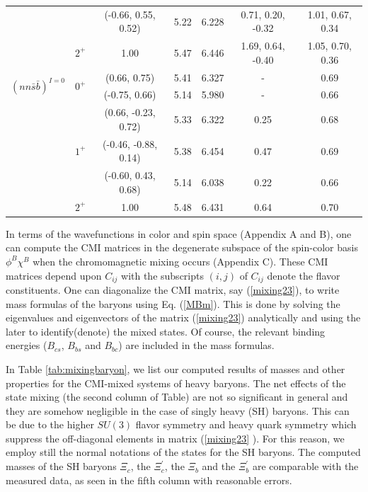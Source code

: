 \documentclass[12pt,prd,onecolumn,floatfix,nofootinbib]{revtex4}
\begin{document}
\begin{table}[!htb]
\begin{tabular}{ccccccc}
&  & (-0.66, 0.55, 0.52) & 5.22 & 6.228 & 0.71, 0.20, -0.32 & 1.01, 0.67,
0.34 \\
& $2^{+}$ & 1.00 & 5.47 & 6.446 & 1.69, 0.64, -0.40 & 1.05, 0.70, 0.36 \\
\multirow{2}{*}{${(nn\bar{s}\bar{b})}^{I=0}$} & \multirow{2}{*}{$0^{+}$} &
(0.66, 0.75) & 5.41 & 6.327 & - & 0.69 \\
&  & (-0.75, 0.66) & 5.14 & 5.980 & - & 0.66 \\
& \multirow{3}{*}{$1^{+}$} & (0.66, -0.23, 0.72) & 5.33 & 6.322 & 0.25 & 0.68
\\
&  & (-0.46, -0.88, 0.14) & 5.38 & 6.454 & 0.47 & 0.69 \\
&  & (-0.60, 0.43, 0.68) & 5.14 & 6.038 & 0.22 & 0.66 \\
& $2^{+}$ & 1.00 & 5.48 & 6.431 & 0.64 & 0.70 \\ \hline\hline
\end{tabular}%
\end{table}

In terms of the wavefunctions in color and spin space (Appendix A and B),
one can compute the CMI matrices in the degenerate subspace of the
spin-color basis $\phi ^{B}\chi ^{B}$ when the chromomagnetic mixing occurs
(Appendix C). These CMI matrices depend upon $C_{ij}$ with the subscripts $%
(i,j)$ of $C_{ij}$ denote the flavor constituents. One can diagonalize the
CMI matrix, say (\ref{mixing23}), to write mass formulas of the baryons
using Eq. (\ref{MBm}). This is done by solving the eigenvalues and
eigenvectors of the matrix (\ref{mixing23}) analytically and using the later
to identify(denote) the mixed states. Of course, the relevant binding
energies ($B_{cs}$, $B_{bs}$ and $B_{bc}$) are included in the mass formulas.

In Table \ref{tab:mixingbaryon}, we list our computed results of masses and
other properties for the CMI-mixed systems of heavy baryons. The net effects
of the state mixing (the second column of Table) are not so significant in
general and they are somehow negligible in the case of singly heavy (SH) baryons.
This can be due to the higher $SU(3)$ flavor symmetry and heavy quark
symmetry which suppress the off-diagonal elements in matrix (\ref{mixing23}%
). For this reason, we employ still the normal notations of the states for
the SH baryons. The computed masses of the SH baryons $\Xi _{c}$, the $\Xi
_{c}^{\prime }$, the $\Xi _{b}$ and the $\Xi _{b}^{\prime }$ are comparable
with the measured data, as seen in the fifth column with reasonable errors.
\end{document}
